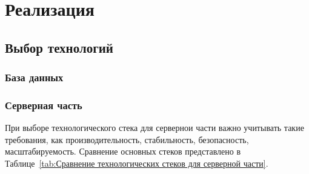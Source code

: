 \documentclass[a4paper,article]{article}
\begin{document}
    \newpage

    \section{Реализация}\label{Реализация}

    \subsection{Выбор технологий}\label{Реализация. Выбор}

    \subsubsection{База данных}\label{Реализация. Выбор. База данных}

    \subsubsection{Серверная часть}\label{Реализация. Выбор. Серверная часть}

    При выборе технологического стека для сервернои части важно учитывать такие требования, как производительность, стабильность, безопасность, масштабируемость. Сравнение основных стеков представлено в Таблице~\ref{tab:Сравнение технологических стеков для серверной части}.
\end{document}
